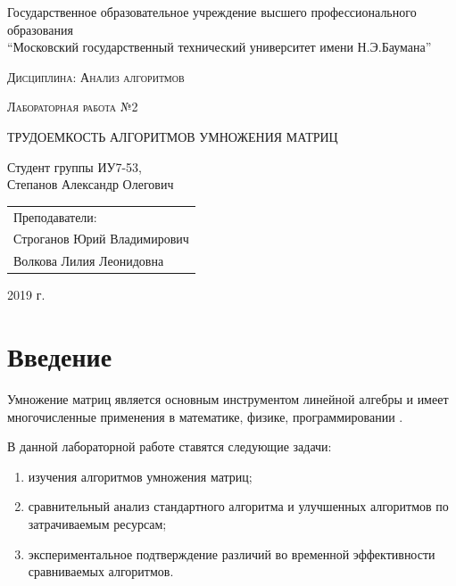 \documentclass[a4paper,12pt]{article}
\newcommand{\anonsection}[1]{\section*{#1}\addcontentsline{toc}{section}{#1}}
\begin{document}
\begin{titlepage}

    \begin{center}
        \large
        Государственное образовательное учреждение высшего профессионального образования\\
        “Московский государственный технический университет имени Н.Э.Баумана”
        \vspace{3cm}

        \textsc{Дисциплина: Анализ алгоритмов}
        \vspace{0.5cm}

        \textsc{Лабораторная работа №2}
        \vspace{3cm}

        {\LARGE ТРУДОЕМКОСТЬ АЛГОРИТМОВ УМНОЖЕНИЯ МАТРИЦ}
        \vspace{3cm}

        Студент группы ИУ7-53,\\
        Степанов Александр Олегович
        \vfill
    \end{center}

    \begin{flushright}
        \begin{tabular}{l}
            Преподаватели:\\
            Строганов Юрий Владимирович\\
            Волкова Лилия Леонидовна
        \end{tabular}
    \end{flushright}

    \begin{center}

        2019 г.

    \end{center}

\end{titlepage}

\tableofcontents

\newpage
\anonsection{Введение}

Умножение матриц является основным инструментом линейной алгебры и имеет
многочисленные применения в математике, физике, программировании \cite{haskell}.

В данной лабораторной работе ставятся следующие задачи:

\begin{enumerate}
    \item изучения алгоритмов умножения матриц;
    \item сравнительный анализ стандартного алгоритма и улучшенных алгоритмов по
        затрачиваемым ресурсам;
    \item экспериментальное подтверждение различий во временной эффективности
        сравниваемых алгоритмов.
\end{enumerate}
\end{document}
